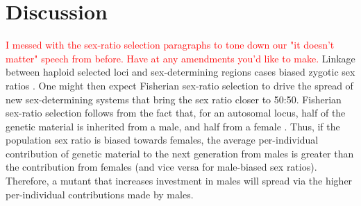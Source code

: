\documentclass[12pt]{article}
\begin{document}
\section*{Discussion}

\textcolor{red}{I messed with the sex-ratio selection paragraphs to tone down our "it doesn't matter" speech from before. Have at any amendments you'd like to make.}
Linkage between haploid selected loci and sex-determining regions cases biased zygotic sex ratios \citep{Hamilton:1967ts,Burt:2006,Field:2012fd,Field:2013cc}.
One might then expect Fisherian sex-ratio selection to drive the spread of new sex-determining systems that bring the sex ratio closer to 50:50. 
Fisherian sex-ratio selection follows from the fact that, for an autosomal locus, half of the genetic material is inherited from a male, and half from a female \citep{Fisher:1930wy,West:2009we}. 
Thus, if the population sex ratio is biased towards females, the average per-individual contribution of genetic material to the next generation from males is greater than the contribution from females (and vice versa for male-biased sex ratios). 
Therefore, a mutant that increases investment in males will spread via the higher per-individual contributions made by males. 
\end{document}
